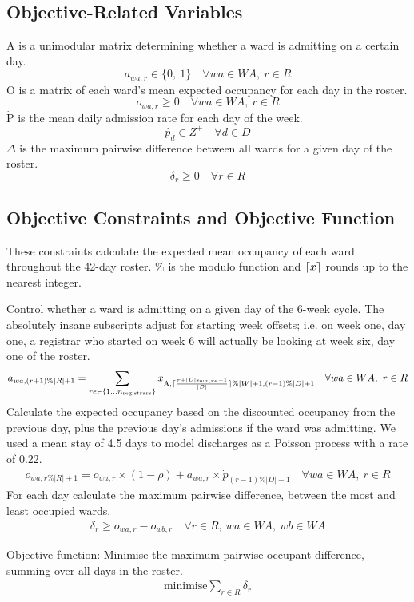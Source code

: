 \documentclass[a4paper]{article}
\DeclarePairedDelimiter{\ceil}{\lceil}{\rceil}
\begin{document}
\subsection{Objective-Related Variables}

A is a unimodular matrix determining whether a ward is admitting on a certain day.
$$a_{wa, r} \in \{0,\ 1\} \quad\forall wa\in WA,\ r\in R$$
O is a matrix of each ward's mean expected occupancy for each day in the roster.
$$o_{wa, r} \ge 0 \quad\forall wa\in WA,\ r\in R$$
$\dot{\text{P}}$ is the mean daily admission rate for each day of the week.
$$\dot{p_{d}} \in Z^+ \quad\forall d\in D$$
$\Delta$ is the maximum pairwise difference between all wards for a given day of the roster.
$$\delta_r \ge 0 \quad\forall r \in R$$

\subsection{Objective Constraints and Objective Function}

These constraints calculate the expected mean occupancy of each ward throughout the 42-day roster. $\%$ is the modulo function and $\ceil{x}$ rounds up to the nearest integer.

Control whether a ward is admitting on a given day of the 6-week cycle. The absolutely insane subscripts adjust for starting week offsets; i.e. on week one, day one, a registrar who started on week 6 will actually be looking at week six, day one of the roster.
\begin{align}
  a_{wa, (r+1)\%|R|+1} = \sum_{re\in \{1\dots n_\text{registrars}\}}{x_{\text{A}, \ceil{\frac{r+|D|\text{s}_{wa, re}-1}{|D|}} \% |W|+1, (r-1) \% |D|+1}} \quad\forall wa \in WA,\ r \in R
\end{align}
Calculate the expected occupancy based on the discounted occupancy from the previous day, plus the previous day's admissions if the ward was admitting. We used a mean stay of 4.5 days to model discharges as a Poisson process with a rate of 0.22.
\begin{align}
  o_{wa, r\%|R|+1} = o_{wa, r} \times (1-\rho) + a_{wa, r} \times \dot{p}_{(r-1)\%|D|+1} \quad\forall wa \in WA,\ r \in R
\end{align}
For each day calculate the maximum pairwise difference, between the most and least occupied wards.
\begin{align}
  \delta_r \ge o_{wa, r} - o_{wb, r} \quad\forall r \in R,\ wa \in WA,\ wb \in WA
\end{align}

\begin{framed}
Objective function: Minimise the maximum pairwise occupant difference, summing over all days in the roster.
\begin{align}
  \text{minimise} \sum_{r\in R}{\delta_r}
\end{align}
\end{framed}
\end{document}
